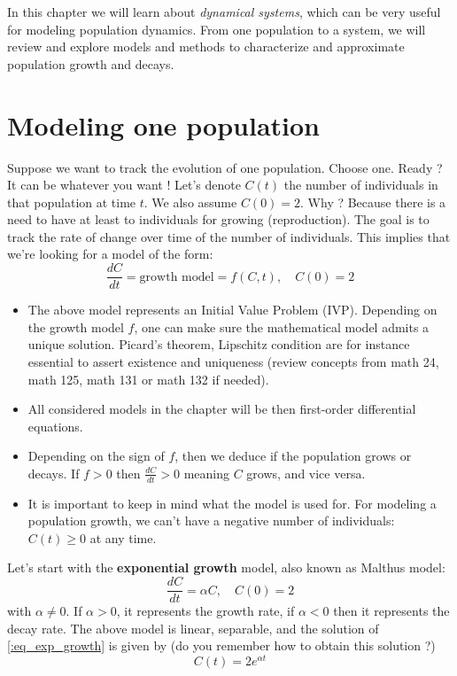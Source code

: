 \minitoc

In this chapter we will learn about \textit{dynamical systems}, which can be very useful for modeling population dynamics. From one population to a system, we will review and explore models and methods to characterize and approximate population growth and decays.

\section{Modeling one population}
Suppose we want to track the evolution of one population. Choose one. Ready ? It can be whatever you want ! Let's denote $C(t)$ the number of individuals in that population at time $t$. We also assume $C(0)=2$. Why ? Because there is a need to have at least to individuals for growing (reproduction). The goal is to track the rate of change over time of the number of individuals. This implies that we're looking for a model of the form:
\[\displaystyle \frac{dC}{dt} = \mbox{growth model} = f(C,t), \quad C(0) =2 \]
\begin{itemize}
\item The above model represents an Initial Value Problem (IVP). Depending on the growth model $f$, one can make sure the mathematical model admits a unique solution. Picard's theorem, Lipschitz condition are for instance essential to assert existence and uniqueness (review concepts from math 24, math 125, math 131 or math 132 if needed).
\item All considered models in the chapter will be then first-order differential equations.
\item Depending on the sign of $f$, then we deduce if the population grows or decays. If $f >0$ then $\displaystyle \frac{dC}{dt} >0$ meaning $C$ grows, and vice versa.
\item It is important to keep in mind what the model is used for. For modeling a population growth, we can't have a negative number of individuals: $C(t) \geq 0$ at any time.
\end{itemize}

Let's start with the \textbf{exponential growth} model, also known as Malthus model:
\begin{equation}\label{:eq_exp_growth}
\displaystyle \frac{dC}{dt} = \alpha C ,\quad C(0) = 2 
\end{equation}
with $\alpha \neq 0$. If $\alpha>0$, it represents the growth rate, if $\alpha <0$ then it represents the decay rate. The above model is linear, separable, and the solution of \eqref{:eq_exp_growth} is given by (do you remember how to obtain this solution ?)
\[C(t) = 2 e^{\alpha t}\] 

